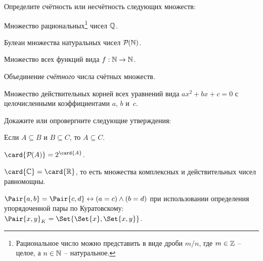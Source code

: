 \documentclass[a4paper,12pt]{article}
\begin{document}
\begin{tasks}
    \item Определите счётность или несчётность следующих множеств:

    \begin{subtasks}
        \item Множество рациональных\footnote{Рациональное число можно представить в виде дроби $m / n$, где $m \in \mathbb{Z}$ \--- целое, а $n \in \mathbb{N}$ \--- натуральное.} чисел $\mathbb{Q}$.
        \item Булеан множества натуральных чисел $\mathcal{P}\mkern-1mu({\mathbb{N}})$.
        \item Множество всех функций вида $f : \mathbb{N} \to \mathbb{N}$.
        \item Объединение \textit{счётного} числа счётных множеств.
        \item Множество действительных корней всех уравнений вида $ax^2 + bx + c = 0$ с целочисленными коэффициентами $a$, $b$ и~$c$.
    \end{subtasks}


    \item Докажите или опровергните следующие утверждения:

    \begin{subtasks}
        \item Если $A \subseteq B$ и $B \subseteq C$, то $A \subseteq C$.
        \item $\card{\powerset{A}} = 2^{\card{A}}$.
        \item $\card{\Complex} = \card{\Real}$, то есть множества комплексных и действительных чисел равномощны.
        \item $\Pair{a,b} = \Pair{c,d} \iff (a = c) \land (b = d)$ при использовании определения упорядоченной пары по Куратовскому: $\Pair{x, y}_K = \Set{\Set{x}, \Set{x, y}}$.
    \end{subtasks}

\end{tasks}
\end{document}

